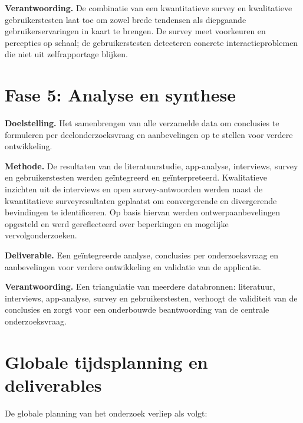\textbf{Verantwoording.}
De combinatie van een kwantitatieve survey en kwalitatieve gebruikerstesten
laat toe om zowel brede tendensen als diepgaande gebruikerservaringen in kaart
te brengen. De survey meet voorkeuren en percepties op schaal; de gebruikerstesten
detecteren concrete interactieproblemen die niet uit zelfrapportage blijken.

\section{Fase 5: Analyse en synthese}

\textbf{Doelstelling.}
Het samenbrengen van alle verzamelde data om conclusies te formuleren per
deelonderzoeksvraag en aanbevelingen op te stellen voor verdere ontwikkeling.

\textbf{Methode.}
De resultaten van de literatuurstudie, app-analyse, interviews, survey en
gebruikerstesten werden geïntegreerd en geïnterpreteerd. Kwalitatieve inzichten
uit de interviews en open survey-antwoorden werden naast de kwantitatieve
surveyresultaten geplaatst om convergerende en divergerende bevindingen te
identificeren. Op basis hiervan werden ontwerpaanbevelingen opgesteld en werd
gereflecteerd over beperkingen en mogelijke vervolgonderzoeken.

\textbf{Deliverable.}
Een geïntegreerde analyse, conclusies per onderzoeksvraag en aanbevelingen voor
verdere ontwikkeling en validatie van de applicatie.

\textbf{Verantwoording.}
Een triangulatie van meerdere databronnen: literatuur, interviews, app-analyse,
survey en gebruikerstesten, verhoogt de validiteit van de conclusies en zorgt
voor een onderbouwde beantwoording van de centrale onderzoeksvraag.

\section{Globale tijdsplanning en deliverables}

De globale planning van het onderzoek verliep als volgt:

